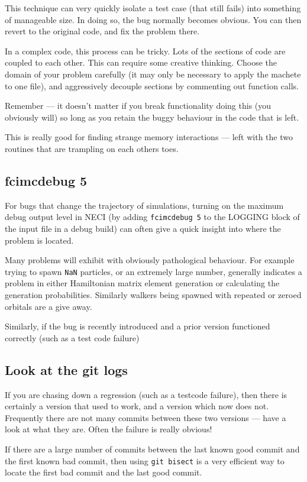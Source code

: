 \documentclass[a4paper,notitlepage,dvipsnames]{scrreprt}
\let\code\lstinline
\begin{document}
{{{	This technique can very quickly isolate a test case (that still fails) into
	something of manageable size. In doing so, the bug normally becomes
	obvious. You can then revert to the original code, and fix the problem
	there.

	In a complex code, this process can be tricky. Lots of the sections of code
	are coupled to each other. This can require some creative thinking. Choose
	the domain of your problem carefully (it may only be necessary to apply the
	machete to one file), and aggressively decouple sections by commenting out
	function calls.

	Remember --- it doesn't matter if you break functionality doing this (you
	obviously will) so long as you retain the buggy behaviour in the code that
	is left.

	This is really good for finding strange memory interactions --- left with
	the two routines that are trampling on each others toes.

\subsection{{\ttfamily fcimcdebug 5}}
	For bugs that change the trajectory of simulations, turning on the maximum
	debug output level in NECI (by adding \code{fcimcdebug 5} to the
	LOGGING block of the input file in a debug build) can often give a quick
	insight into where the problem is located.

	Many problems will exhibit with obviously pathological behaviour. For
	example trying to spawn \code{NaN} particles, or an extremely large
	number, generally indicates a problem in either Hamiltonian matrix element
	generation or calculating the generation probabilities. Similarly walkers
	being spawned with repeated or zeroed orbitals are a give away.

	Similarly, if the bug is recently introduced and a prior version functioned
	correctly (such as a test code failure)

\subsection{Look at the git logs}
	If you are chasing down a regression (such as a testcode failure), then
	there is certainly a version that used to work, and a version which now
	does not. Frequently there are not many commits between these two versions
	--- have a look at what they are. Often the failure is really obvious!

	If there are a large number of commits between the last known good commit
	and the first known bad commit, then using \code{git bisect} is a very
	efficient way to locate the first bad commit and the last good commit.


}}}
\end{document}
